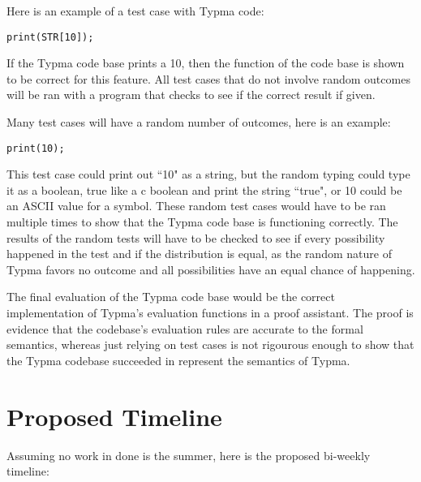 \documentclass[10pt,twocolumn]{article}
\begin{document}
Here is an example of a test case with Typma code:

\begin{lstlisting}
print(STR[10]);
\end{lstlisting}

If the Typma code base prints a 10, then the function of the code base is shown to be correct for this feature. All test cases that do not involve random outcomes will be ran with a program that checks to see if the correct result if given.

Many test cases will have a random number of outcomes, here is an example:

\begin{lstlisting}
print(10);
\end{lstlisting}

This test case could print out ``10" as a string, but the random typing could type it as a boolean, true like a c boolean and print the string ``true", or 10 could be an ASCII value for a symbol. These random test cases would have to be ran multiple times to show that the Typma code base is functioning correctly. The results of the random tests will have to be checked to see if every possibility happened in the test and if the distribution is equal, as the random nature of Typma favors no outcome and all possibilities have an equal chance of happening.

The final evaluation of the Typma code base would be the correct implementation of Typma's evaluation functions in a proof assistant. The proof is evidence that the codebase's evaluation rules are accurate to the formal semantics, whereas just relying on test cases is not rigourous enough to show that the Typma codebase succeeded in represent the semantics of Typma.

\section{Proposed Timeline}

Assuming no work in done is the summer, here is the proposed bi-weekly timeline:
\end{document}
